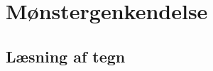 \section{Mønstergenkendelse}

\begin{comment}
Noter fra møde med Søren 20/2:
Opret feature vektor $f$ for hvert bogstav $\omega$
Finde middelværdivektor for hvert $\omega$.
Afstandsfunktion: den afstand til en middelværdivektor der er mindst, vælges. Dvs. det bogstav vælges.
Featurevektorafstand udregnes hver gang

Euklidisk afstand
En-eller-anden mahap afstand
\end{comment}

\subsection{Læsning af tegn}
